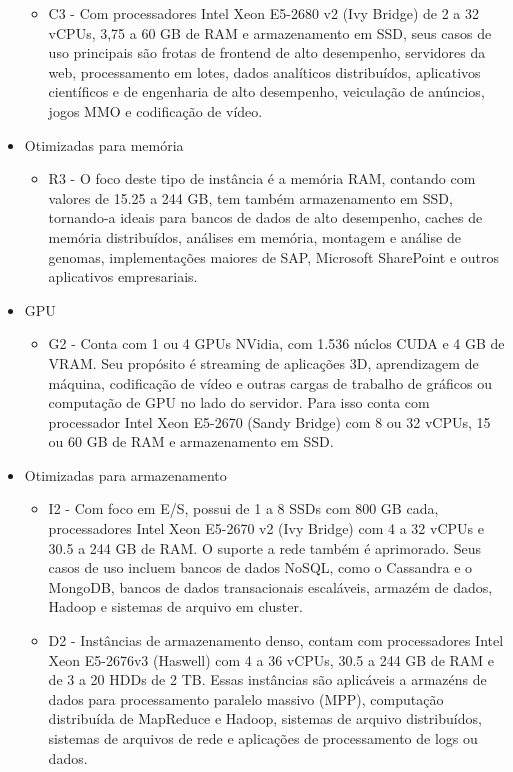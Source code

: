 \documentclass[tg]{mdtufsm}
\begin{document}
\begin{itemize}
\begin{itemize}
	\item C3 - Com processadores Intel Xeon E5-2680 v2 (Ivy Bridge) de 2 a 32 vCPUs, 3,75 a 60 GB de RAM e armazenamento em SSD, seus casos de uso principais são frotas de frontend de alto desempenho, servidores da web, processamento em lotes, dados analíticos distribuídos, aplicativos científicos e de engenharia de alto desempenho, veiculação de anúncios, jogos MMO e codificação de vídeo.
	\end{itemize}
\item Otimizadas para memória
	\begin{itemize}
	\item R3 - O foco deste tipo de instância é a memória RAM, contando com valores de 15.25 a 244 GB, tem também armazenamento em SSD, tornando-a ideais para bancos de dados de alto desempenho, caches de memória distribuídos, análises em memória, montagem e análise de genomas, implementações maiores de SAP, Microsoft SharePoint e outros aplicativos empresariais.
	\end{itemize}
\item GPU
	\begin{itemize}
	\item G2 - Conta com 1 ou 4 GPUs NVidia, com 1.536 núclos CUDA e 4 GB de VRAM. Seu propósito é streaming de aplicações 3D, aprendizagem de máquina, codificação de vídeo e outras cargas de trabalho de gráficos ou computação de GPU no lado do servidor. Para isso conta com processador Intel Xeon E5-2670 (Sandy Bridge) com 8 ou 32 vCPUs, 15 ou 60 GB de RAM e armazenamento em SSD.
	\end{itemize}
\item Otimizadas para armazenamento
	\begin{itemize}
	\item I2 - Com foco em E/S, possui de 1 a 8 SSDs com 800 GB cada, processadores Intel Xeon E5-2670 v2 (Ivy Bridge) com 4 a 32 vCPUs e 30.5 a 244 GB de RAM. O suporte a rede também é aprimorado. Seus casos de uso incluem bancos de dados NoSQL, como o Cassandra e o MongoDB, bancos de dados transacionais escaláveis, armazém de dados, Hadoop e sistemas de arquivo em cluster.
	\item D2 - Instâncias de armazenamento denso, contam com processadores Intel Xeon E5-2676v3 (Haswell) com 4 a 36 vCPUs, 30.5 a 244 GB de RAM e de 3 a 20 HDDs de 2 TB. Essas instâncias são aplicáveis a armazéns de dados para processamento paralelo massivo (MPP), computação distribuída de MapReduce e Hadoop, sistemas de arquivo distribuídos, sistemas de arquivos de rede e aplicações de processamento de logs ou dados.
	\end{itemize}
\end{itemize}
\end{document}

